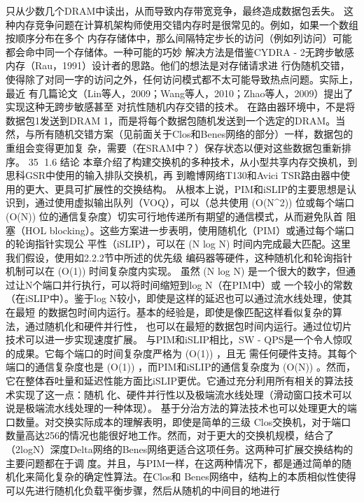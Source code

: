 只从少数几个DRAM中读出，从而导致内存带宽竞争，最终造成数据包丢失。
这种内存竞争问题在计算机架构师使用交错内存时是很常见的。例如，如果一个数组按顺序分布在多个
内存存储体中，那么间隔特定步长的访问（例如列访问）可能都会命中同一个存储体。一种可能的巧妙
解决方法是借鉴CYDRA - 2无跨步敏感内存（Rau，1991）设计者的思路。他们的想法是对存储请求进
行伪随机交错，使得除了对同一字的访问之外，任何访问模式都不太可能导致热点问题。实际上，最近
有几篇论文（Lin等人，2009；Wang等人，2010；Zhao等人，2009）提出了实现这种无跨步敏感甚至
对抗性随机内存交错的技术。
在路由器环境中，不是将数据包1发送到DRAM 1，而是将每个数据包随机发送到一个选定的DRAM。当
然，与所有随机交错方案（见前面关于Clos和Benes网络的部分）一样，数据包的重组会变得更加复
杂，需要（在SRAM中？）保存状态以便对这些数据包重新排序。
                                                          35
1.6 结论
本章介绍了构建交换机的多种技术，从小型共享内存交换机，到思科GSR中使用的输入排队交换机，再
到瞻博网络T130和Avici TSR路由器中使用的更大、更具可扩展性的交换结构。
从根本上说，PIM和iSLIP的主要思想是认识到，通过使用虚拟输出队列（VOQ），可以（总共使用
(O(N^{2})) 位或每个端口 (O(N)) 位的通信复杂度）切实可行地传递所有期望的通信模式，从而避免队首
阻塞（HOL blocking）。这些方案进一步表明，使用随机化（PIM）或通过每个端口的轮询指针实现公
平性（iSLIP），可以在 (N log N) 时间内完成最大匹配。这里我们假设，使用如2.2.2节中所述的优先级
编码器等硬件，这种随机化和轮询指针机制可以在 (O(1)) 时间复杂度内实现。
虽然 (N log N) 是一个很大的数字，但通过让N个端口并行执行，可以将时间缩短到log N（在PIM中）或
一个较小的常数（在iSLIP中）。鉴于log N较小，即使是这样的延迟也可以通过流水线处理，使其在最短
的数据包时间内运行。基本的经验是，即使是像匹配这样看似复杂的算法，通过随机化和硬件并行性，
也可以在最短的数据包时间内运行。通过位切片技术可以进一步实现速度扩展。
与PIM和iSLIP相比，SW - QPS是一个令人惊叹的成果。它每个端口的时间复杂度严格为 (O(1)) ，且无
需任何硬件支持。其每个端口的通信复杂度也是 (O(1)) ，而PIM和iSLIP的通信复杂度为 (O(N)) 。然而，
它在整体吞吐量和延迟性能方面比iSLIP更优。它通过充分利用所有相关的算法技术实现了这一点：随机
化、硬件并行性以及极端流水线处理（滑动窗口技术可以说是极端流水线处理的一种体现）。
基于分治方法的算法技术也可以处理更大的端口数量。对交换实际成本的理解表明，即使是简单的三级
Clos交换机，对于端口数量高达256的情况也能很好地工作。然而，对于更大的交换机规模，结合了
（2logN）深度Delta网络的Benes网络更适合这项任务。这两种可扩展交换结构的主要问题都在于调
度。并且，与PIM一样，在这两种情况下，都是通过简单的随机化来简化复杂的确定性算法。在Clos和
Benes网络中，结构上的本质相似性使得可以先进行随机化负载平衡步骤，然后从随机的中间目的地进行
